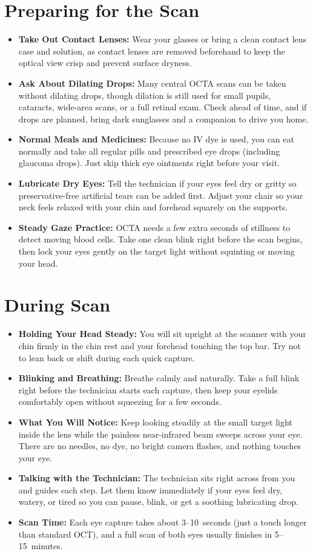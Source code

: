 \section{Preparing for the Scan}
\begin{itemize}
\item \textbf{Take Out Contact Lenses:} Wear your glasses or bring a clean contact lens case and solution, as contact lenses are removed beforehand to keep the optical view crisp and prevent surface dryness.
\item \textbf{Ask About Dilating Drops:} Many central OCTA scans can be taken without dilating drops, though dilation is still used for small pupils, cataracts, wide-area scans, or a full retinal exam. Check ahead of time, and if drops are planned, bring dark sunglasses and a companion to drive you home.
\item \textbf{Normal Meals and Medicines:} Because no IV dye is used, you can eat normally and take all regular pills and prescribed eye drops (including glaucoma drops). Just skip thick eye ointments right before your visit.
\item \textbf{Lubricate Dry Eyes:} Tell the technician if your eyes feel dry or gritty so preservative-free artificial tears can be added first. Adjust your chair so your neck feels relaxed with your chin and forehead squarely on the supports.
\item \textbf{Steady Gaze Practice:} OCTA needs a few extra seconds of stillness to detect moving blood cells. Take one clean blink right before the scan begins, then lock your eyes gently on the target light without squinting or moving your head.
\end{itemize}

\section{During Scan}
\begin{itemize}
\item \textbf{Holding Your Head Steady:} You will sit upright at the scanner with your chin firmly in the chin rest and your forehead touching the top bar. Try not to lean back or shift during each quick capture.
\item \textbf{Blinking and Breathing:} Breathe calmly and naturally. Take a full blink right before the technician starts each capture, then keep your eyelids comfortably open without squeezing for a few seconds.
\item \textbf{What You Will Notice:} Keep looking steadily at the small target light inside the lens while the painless near-infrared beam sweeps across your eye. There are no needles, no dye, no bright camera flashes, and nothing touches your eye.
\item \textbf{Talking with the Technician:} The technician sits right across from you and guides each step. Let them know immediately if your eyes feel dry, watery, or tired so you can pause, blink, or get a soothing lubricating drop.
\item \textbf{Scan Time:} Each eye capture takes about 3--10~seconds (just a touch longer than standard OCT), and a full scan of both eyes usually finishes in 5--15~minutes.
\end{itemize}

